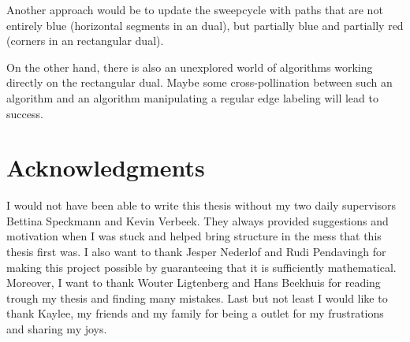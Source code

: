 Another approach would be to update the sweepcycle with paths that are not entirely blue (horizontal segments in an dual), but partially blue and partially red (corners in an rectangular dual).

On the other hand, there is also an unexplored world of algorithms working directly on the rectangular dual. Maybe some cross-pollination between such an algorithm and an algorithm manipulating a regular edge labeling will lead to success.

\newpage
\thispagestyle{plain}
\section*{Acknowledgments}
I would not have been able to write this thesis without my two daily supervisors Bettina Speckmann and Kevin Verbeek. They always provided suggestions and motivation when I was stuck and helped bring structure in the mess that this thesis first was. I also want to thank Jesper Nederlof and
Rudi Pendavingh for making this project possible by guaranteeing that it is sufficiently mathematical.
Moreover, I want to thank Wouter Ligtenberg and Hans Beekhuis for reading trough my thesis and finding many mistakes. Last but not least I would like to thank Kaylee, my friends and my family for being a outlet for my frustrations and sharing my joys.
